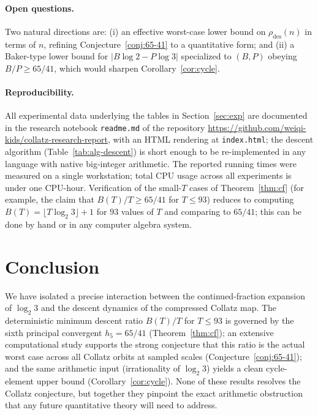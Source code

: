 \documentclass[11pt,a4paper]{article}
\theoremstyle{definition}
\theoremstyle{remark}
\begin{document}
\paragraph{Open questions.}
Two natural directions are: (i) an effective worst-case lower bound
on $\rho_{\mathrm{des}}(n)$ in terms of $n$, refining
Conjecture~\ref{conj:65-41} to a quantitative form; and (ii) a
Baker-type lower bound for $|B \log 2 - P \log 3|$ specialized to
$(B, P)$ obeying $B/P \geq 65/41$, which would sharpen
Corollary~\ref{cor:cycle}.

\paragraph{Reproducibility.}
All experimental data underlying the tables in Section~\ref{sec:exp}
are documented in the research notebook
\texttt{readme.md} of the repository
\url{https://github.com/weiqi-kids/collatz-research-report}, with an
HTML rendering at \texttt{index.html}; the descent algorithm
(Table~\ref{tab:alg-descent}) is short enough to be re-implemented
in any language with native big-integer arithmetic.  The reported
running times
were measured on a single workstation; total CPU usage across all
experiments is under one CPU-hour.  Verification of the small-$T$
cases of Theorem~\ref{thm:cf} (for example, the claim that
$B(T)/T \geq 65/41$ for $T \leq 93$) reduces to computing
$B(T) = \lfloor T \log_2 3 \rfloor + 1$ for $93$ values of $T$ and
comparing to $65/41$; this can be done by hand or in any computer
algebra system.

\section{Conclusion}\label{sec:conc}

We have isolated a precise interaction between the continued-fraction
expansion of $\log_2 3$ and the descent dynamics of the compressed
Collatz map.  The deterministic minimum descent ratio $B(T)/T$ for
$T \leq 93$ is governed by the sixth principal convergent
$h_5 = 65/41$ (Theorem~\ref{thm:cf}); an extensive computational
study supports the strong conjecture that this ratio is the actual
worst case across all Collatz orbits at sampled scales
(Conjecture~\ref{conj:65-41}); and the same arithmetic input
(irrationality of $\log_2 3$) yields a clean cycle-element upper
bound (Corollary~\ref{cor:cycle}).  None of these results resolves
the Collatz conjecture, but together they pinpoint the exact
arithmetic obstruction that any future quantitative theory will need
to address.
\end{document}
